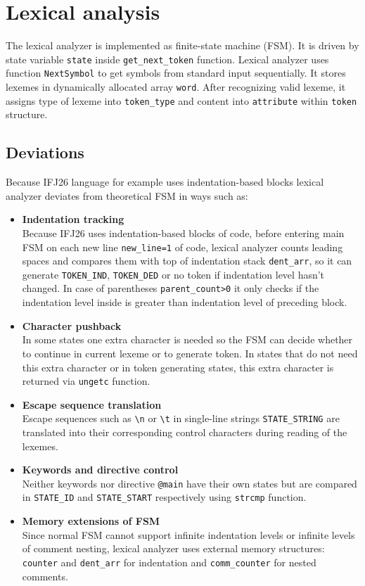 \documentclass[12pt,a4paper]{article}
\begin{document}
\section{Lexical analysis}     
The lexical analyzer is implemented as finite-state machine (FSM). It is driven by state variable \texttt{state} inside \texttt{get\_next\_token} function. Lexical analyzer uses function \texttt{NextSymbol} to get symbols from standard input sequentially. It stores lexemes in dynamically allocated array \texttt{word}. After recognizing valid lexeme, it assigns type of lexeme into \texttt{token\_type} and content into \texttt{attribute} within 
\texttt{token} structure.
\subsection{Deviations}
Because IFJ26 language for example uses indentation-based blocks lexical analyzer deviates from theoretical FSM in ways such as:
\begin{itemize}
    \item \textbf{Indentation tracking}\\
    Because IFJ26 uses indentation-based blocks of code, before entering main FSM on each new line \texttt{new\_line=1} of code, lexical analyzer counts leading spaces and compares them with top of indentation stack \texttt{dent\_arr}, so it can generate \texttt{TOKEN\_IND}, \texttt{TOKEN\_DED} or no token if indentation level hasn't changed. In case of parentheses \texttt{parent\_count>0} it only checks if the indentation level inside is greater than indentation level of preceding block.  
    \item \textbf{Character pushback}\\
    In some states one extra character is needed so the FSM can decide whether to continue in current lexeme or to generate token. In states that do not need this extra character or in token generating states, this extra character is returned via \texttt{ungetc} function.
    \item \textbf{Escape sequence translation}\\
    Escape sequences such as \texttt{\textbackslash{}n} or \texttt{\textbackslash{}t} in single-line strings \texttt{STATE\_STRING} are translated into their corresponding control characters during reading of the lexemes.
    \item \textbf{Keywords and directive control}\\
    Neither keywords nor directive \texttt{@main} have their own states but are compared in \texttt{STATE\_ID} and \texttt{STATE\_START} respectively using \texttt{strcmp} function.
    \item \textbf{Memory extensions of FSM}\\
    Since normal FSM cannot support infinite indentation levels or infinite levels of comment nesting, lexical analyzer uses external memory structures: \texttt{counter} and \texttt{dent\_arr} for indentation and \texttt{comm\_counter} for nested comments.
\end{itemize}
\end{document}
